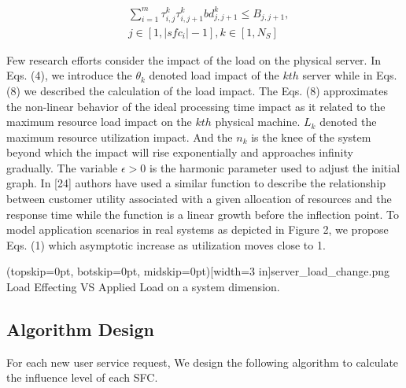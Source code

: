 \documentclass{ieeeaccess}
\begin{document}
\begin{equation}
\begin{aligned}
&\sum_{i=1}^{m}\tau _{i,j}^{k}\tau _{i,j+1}^{k}bd_{j,j+1}^{k}\leq B_{j,j+1},\\
&j\in \left [ 1,|sfc_{i}|-1 \right ],k \in \left [ 1,N_{S} \right ]
\end{aligned}
\end{equation}

Few research efforts consider the impact of the load on the physical server. In Eqs. (4), we introduce the $\theta _{k}$ denoted load impact of the $kth$ server while in Eqs. (8)  we described the calculation of the load impact. The Eqs. (8) approximates the non-linear behavior of the ideal processing time impact as it related to the maximum resource load impact on the $kth$ physical machine. $L_{k}$ denoted the maximum resource utilization impact. And the $n_{k}$ is the knee of the system beyond which the impact will rise exponentially and approaches infinity gradually. The variable $\epsilon >0$  is the harmonic parameter used to adjust the initial graph. In [24] authors have used a similar function to describe the relationship between customer utility associated with a given allocation of resources and the response time while the function is a linear growth before the inflection point. To model application scenarios in real systems as depicted in Figure 2, we propose Eqs. (1) which asymptotic increase as utilization moves close to 1.

\Figure[t!](topskip=0pt, botskip=0pt, midskip=0pt)[width=3 in]{server_load_change.png}
{ Load Effecting VS Applied Load on a system dimension.\label{fig2}}


\subsection{Algorithm Design}
For each new user service request, We design the following algorithm to calculate the influence level of each SFC.



\renewcommand{\algorithmicrequire}{\textbf{Input:}}
\renewcommand{\algorithmicensure}{\textbf{Output:}}
\end{document}
